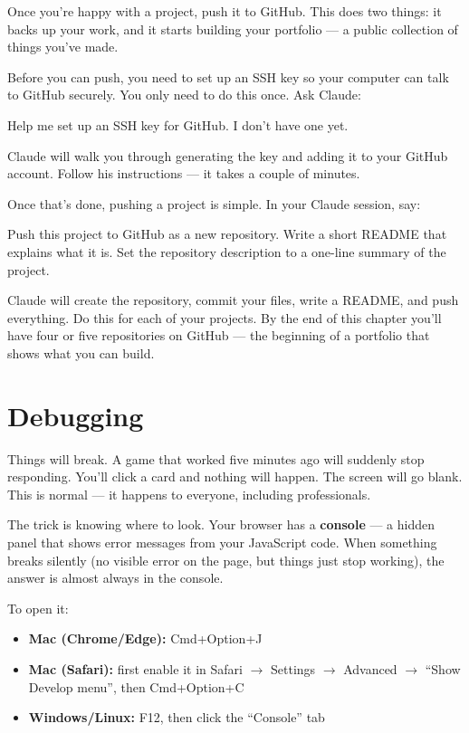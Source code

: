 \documentclass[11pt,a4paper]{article}
\begin{document}
Once you're happy with a project, push it to GitHub. This does two things: it backs up your work, and it starts building your portfolio --- a public collection of things you've made.

Before you can push, you need to set up an SSH key so your computer can talk to GitHub securely. You only need to do this once. Ask Claude:

\begin{tcolorbox}[promptbox]
Help me set up an SSH key for GitHub. I don't have one yet.
\end{tcolorbox}

Claude will walk you through generating the key and adding it to your GitHub account. Follow his instructions --- it takes a couple of minutes.

Once that's done, pushing a project is simple. In your Claude session, say:

\begin{tcolorbox}[promptbox]
Push this project to GitHub as a new repository. Write a short README that explains what it is. Set the repository description to a one-line summary of the project.
\end{tcolorbox}

Claude will create the repository, commit your files, write a README, and push everything. Do this for each of your projects. By the end of this chapter you'll have four or five repositories on GitHub --- the beginning of a portfolio that shows what you can build.

\section{Debugging}

Things will break. A game that worked five minutes ago will suddenly stop responding. You'll click a card and nothing will happen. The screen will go blank. This is normal --- it happens to everyone, including professionals.

The trick is knowing where to look. Your browser has a \textbf{console} --- a hidden panel that shows error messages from your JavaScript code. When something breaks silently (no visible error on the page, but things just stop working), the answer is almost always in the console.

To open it:

\begin{itemize}[leftmargin=1.5em]
  \item \textbf{Mac (Chrome/Edge):} Cmd+Option+J
  \item \textbf{Mac (Safari):} first enable it in Safari \(\rightarrow\) Settings \(\rightarrow\) Advanced \(\rightarrow\) ``Show Develop menu'', then Cmd+Option+C
  \item \textbf{Windows/Linux:} F12, then click the ``Console'' tab
\end{itemize}
\end{document}
